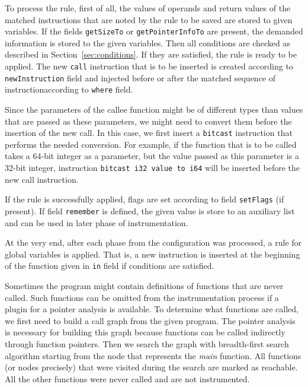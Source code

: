 To process the rule, first of all, the values of operands and return values of
the matched instructions that are noted by the rule to be saved are stored to
given variables. If the fields \texttt{getSizeTo} or \texttt{getPointerInfoTo}
are present, the demanded information is stored to the given variables. Then
all conditions are checked as described in Section~\ref{sec:conditions}. If
they are satisfied, the rule is ready to be applied. The new \texttt{call}
instruction that is to be inserted is created according to
\texttt{newInstruction} field and injected before or after the matched sequence
of instructionaccording to \texttt{where} field.

Since the parameters of the callee function might be of different types than
values that are passed as these parameters, we might need to convert them
before the insertion of the new call. In this case, we first insert a
\texttt{bitcast} instruction that performs the needed conversion. For example,
if the function that is to be called takes a 64-bit integer as a parameter, but
the value passed as this parameter is a 32-bit integer, instruction
\texttt{bitcast i32 value to i64} will be inserted before the new call
instruction.

If the rule is successfully applied, flags are set according to field
\texttt{setFlags} (if present). If field \texttt{remember} is defined, the
given value is store to an auxiliary list and can be used in later phase of
instrumentation.

At the very end, after each phase from the configuration was processed, a rule
for global variables is applied. That is, a new instruction is inserted at the
beginning of the function given in \texttt{in} field if conditions are
satisfied.

Sometimes the program might contain definitions of functions that are never
called. Such functions can be omitted from the instrumentation process if a
plugin for a pointer analysis is available. To determine what functions are
called, we first need to build a call graph from the given program. The pointer
analysis is necessary for building this graph because functions can be called
indirectly through function pointers. Then we search the graph with
breadth-first search algorithm starting from the node that represents the
\emph{main} function. All functions (or nodes precisely) that were visited
during the search are marked as reachable. All the other functions were never
called and are not instrumented.


